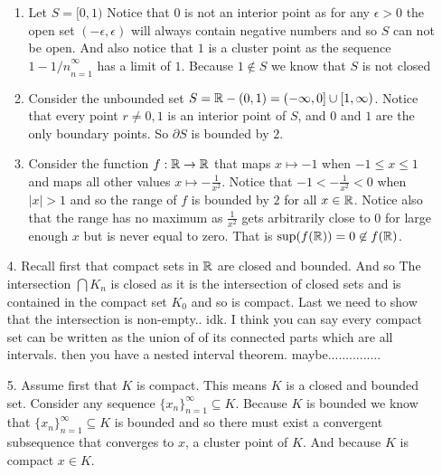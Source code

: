 \documentclass[12pt]{amsart}
\begin{document}
\begin{itemize}
\begin{enumerate}
            \item Let $S=[0,1)$ Notice that $0$ is not an interior point as for any $\epsilon>0$
                  the open set $(-\epsilon,\epsilon)$ will always contain negative numbers and so
                  $S$ can not be open. And also notice that $1$ is a cluster point as the
                  sequence ${1-1/n}_{n=1}^\infty$ has a limit of $1$. Because $1\not\in S$ we
                  know that $S$ is not closed

            \item Consider the unbounded set $S=\mathbb{R}-(0,1)=(-\infty,0]\cup [1,\infty)$. Notice that
                  every point $r\neq 0,1$ is an interior point of $S$, and $0$ and $1$ are the
                  only boundary points. So $\partial S$ is bounded by $2$.

            \item Consider the function $f:\mathbb{R}\rightarrow\mathbb{R}$ that maps $x\mapsto -1$ when $-1\leq x\leq 1$
                  and maps all other values $x\mapsto -\frac{1}{x^2}$. Notice that
                  $-1<-\frac{1}{x^2}<0$ when $|x|>1$ and so the range of $f$ is bounded by $2$
                  for all $x\in \mathbb{R}$. Notice also that the range has no maximum as $\frac{1}{x^2}$
                  gets arbitrarily close to $0$ for large enough $x$ but is never equal to zero.
                  That is $\sup(f(\mathbb{R}))=0\not\in f(\mathbb{R})$.
        \end{enumerate}

    \item[4.] Recall first that compact sets in $\mathbb{R}$ are closed and bounded. And so The
        intersection $\bigcap K_n$ is closed as it is the intersection of closed sets
        and is contained in the compact set $K_0$ and so is compact. Last we need to
        show that the intersection is non-empty.. idk. I think you can say every
        compact set can be written as the union of of its connected parts which are all
        intervals. then you have a nested interval theorem. maybe...............%

    \item[5.] Assume first that $K$ is compact. This means $K$ is a closed and bounded set.
        Consider any sequence $\{x_n\}_{n=1}^\infty\subseteq K$. Because $K$ is bounded we
        know that $\{x_n\}_{n=1}^\infty\subseteq K$ is bounded and so there must exist a
        convergent subsequence that converges to $x$, a cluster point of $K$. And
        because $K$ is compact $x\in K$.


\end{itemize}
\end{document}
